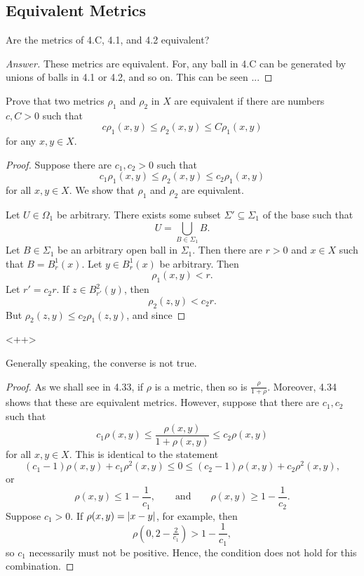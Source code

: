 \subsection{Equivalent Metrics}

\begin{minorEx}
    Are the metrics of 4.C, 4.1, and 4.2 equivalent?
\end{minorEx}

\begin{proof}[Answer]
    These metrics are equivalent. For, any ball in 4.C can be generated by
    unions of balls in 4.1 or 4.2, and so on. This can be seen ...    
\end{proof}

\begin{minorEx}
    Prove that two metrics $\rho_1$ and $\rho_2$ in $X$ are equivalent if there
    are numbers $c, C > 0$ such that
    \[
        c \rho_1(x,y) \leq \rho_2(x,y) \leq C \rho_1(x,y)
    \]
    for any $x, y \in X$.
\end{minorEx}

\begin{proof}
    Suppose there are $c_1, c_2 > 0$ such that 
    \[
        c_1 \rho_1(x,y) \leq \rho_2(x, y) \leq c_2 \rho_1(x,y)
    \]
    for all $x, y \in X$. We show that $\rho_1$ and $\rho_2$ are equivalent. 

    Let $U \in \Omega_1$ be arbitrary. There exists some subset $\Sigma'
    \subseteq \Sigma_1$ of the base such that
    \[
        U = \bigcup_{B \in \Sigma_1} B.
    \]
    Let $B \in \Sigma_1$ be an arbitrary open ball in $\Sigma_1$. Then there are
    $r > 0$ and $x \in X$ such that $B = B^1_{r}(x)$. Let $y \in B^1_{r}(x)$ be
    arbitrary. Then
    \[
        \rho_1(x,y) < r.
    \]
    Let $r' = c_2 r$. If $z \in B_{r'}^2(y)$, then 
    \[
        \rho_2(z,y) < c_2 r.
    \]
    But $\rho_2(z,y) \leq c_2 \rho_1(z,y)$, and since
\end{proof}<++>

\begin{minorEx}
    Generally speaking, the converse is not true.
\end{minorEx}

\begin{proof}
    As we shall see in 4.33, if $\rho$ is a metric, then so is $\frac{\rho}{1 +
    \rho}$. Moreover, 4.34 shows that these are equivalent metrics. However,
    suppose that there are $c_1, c_2$ such that 
    \[
        c_1 \rho(x, y) \leq
        \frac{\rho(x, y)}{1 + \rho(x, y)} \leq
        c_2 \rho(x, y)
    \]
    for all $x, y \in X$. This is identical to the statement
    \[
        (c_1 - 1) \rho(x, y) + c_1 \rho^2(x,y) \leq 0 \leq
        (c_2 - 1) \rho(x, y) + c_2 \rho^2(x,y),
    \]
    or
    \[
        \rho(x, y) \leq 1 - \frac{1}{c_1},
        \qquad \text{and} \qquad
        \rho(x, y) \geq 1 - \frac{1}{c_2}.
    \]
    Suppose $c_1 > 0$. If $\rho(x,y) = |x - y|$, for example, then
    \[
        \rho(0, 2 - \tfrac{2}{c_1}) > 1 - \frac{1}{c_1},
    \]
    so $c_1$ necessarily must not be positive. Hence, the condition does not
    hold for this combination.
\end{proof}

